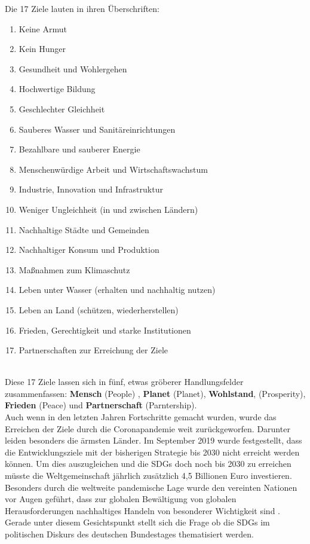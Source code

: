 \documentclass[letterpaper]{article}
\begin{document}
Die 17 Ziele lauten in ihren Überschriften: \cite{Agenda2030}
 \begin{enumerate}
     \item Keine Armut
     \item Kein Hunger 
     \item Gesundheit und Wohlergehen 
     \item Hochwertige Bildung 
     \item Geschlechter Gleichheit 
     \item Sauberes Wasser und Sanitäreinrichtungen 
     \item Bezahlbare und sauberer Energie 
     \item Menschenwürdige Arbeit und Wirtschaftswachstum 
     \item Industrie, Innovation und Infrastruktur
     \item Weniger Ungleichheit (in und zwischen Ländern)
     \item Nachhaltige Städte und Gemeinden
     \item Nachhaltiger Konsum und Produktion 
     \item Maßnahmen zum Klimaschutz
     \item Leben unter Wasser (erhalten und nachhaltig nutzen)
     \item Leben an Land (schützen, wiederherstellen)
     \item Frieden, Gerechtigkeit und starke Institutionen 
     \item Partnerschaften zur Erreichung der Ziele
    
 \end{enumerate}\\
Diese 17 Ziele lassen sich in fünf, etwas gröberer Handlungsfelder zusammenfassen: \textbf{Mensch} (People) , \textbf{Planet} (Planet), \textbf{Wohlstand}, (Prosperity), \textbf{Frieden} (Peace) und \textbf{Partnerschaft} (Parntership).\\
Auch wenn in den letzten Jahren Fortschritte gemacht wurden, wurde das Erreichen der Ziele durch die Coronapandemie weit zurückgeworfen. Darunter leiden besonders die ärmsten Länder\cite{Agenda2030}. Im September 2019 wurde festgestellt, dass die Entwicklungsziele mit der bisherigen Strategie bis 2030 nicht erreicht werden können. Um dies auszugleichen und die SDGs doch noch bis 2030 zu erreichen müsste die Weltgemeinschaft jährlich zusätzlich 4,5 Billionen Euro investieren. Besonders durch die weltweite pandemische Lage wurde den vereinten Nationen vor Augen geführt, dass zur globalen Bewältigung von globalen Herausforderungen nachhaltiges Handeln von besonderer Wichtigkeit sind \cite{Bericht}.\\
Gerade unter diesem Gesichtspunkt stellt sich die Frage ob die SDGs im politischen Diskurs des deutschen Bundestages thematisiert werden. 
 \clearpage
 
\end{document}
